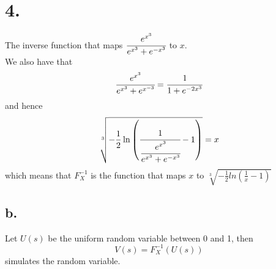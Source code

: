 \documentclass[11pt]{article}
\begin{document}
\section*{4.}
The inverse function that maps $\cfrac{e^{x^3}}{e^{x^3} + e^{-x^3}}$ to $x$. \\
We also have that 
\[
    \cfrac{e^{x^3}}{e^{x^3} + e^{x^{-3}}} = \cfrac{1}{1 + e^{-2x^3}}
\]
and hence 
\[
    \sqrt[3]{-\frac{1}{2}\ln\left(\cfrac{1}{\cfrac{e^{x^3}}{e^{x^3} + e^{-x^3}}}-1\right)} = x    
\]
which means that $F^{-1}_X$ is the function that maps $x$ to $\sqrt[3]{-\frac{1}{2}ln(\frac{1}{x}-1)}$ 
\subsection*{b.}
Let $U(s)$ be the uniform random variable between 0 and 1, then 
\[
    V(s) = F^{-1}_X(U(s))    
\]
simulates the random variable.
\end{document}
